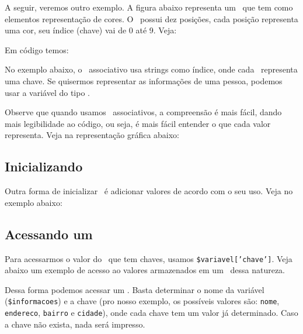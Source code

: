 A seguir, veremos outro exemplo. A figura abaixo representa um \tipoarray~que tem 
como elementos representação de cores. O \tipoarray~possui dez posições, 
cada posição representa uma cor, seu índice (chave) vai de 0 até 9. Veja:


Em código temos:



No exemplo abaixo, o \tipoarray~associativo usa strings como índice, onde cada 
\tipostring~representa uma chave. Se quisermos representar as informações de uma
pessoa, podemos usar a variável do tipo \tipoarray.



Observe que quando usamos \tipoarrays~associativos, a compreensão é mais fácil, 
dando mais legibilidade ao código, ou seja, é mais fácil entender o que cada valor
representa. Veja na representação gráfica abaixo:


\subsection{Inicializando \tipoarrays}
\label{inicializando-arrays}

Outra forma de inicializar \tipoarrays~é adicionar valores de acordo com o seu 
uso. Veja no exemplo abaixo:



\subsection{Acessando um \tipoarray}
\label{acessando-um-array}

Para acessarmos o valor do \tipoarray~que tem chaves, usamos \texttt{\$variavel['chave']}. 
Veja abaixo um exemplo de acesso ao valores armazenados em um \tipoarray~dessa natureza.



Dessa forma podemos acessar um \tipoarray. Basta determinar o nome da variável
(\texttt{\$informacoes}) e a chave (pro nosso exemplo, os possíveis valores são:
\texttt{nome}, \texttt{endereco}, \texttt{bairro} e \texttt{cidade}), onde cada chave tem 
um valor já determinado. Caso a chave não exista, nada será impresso.

